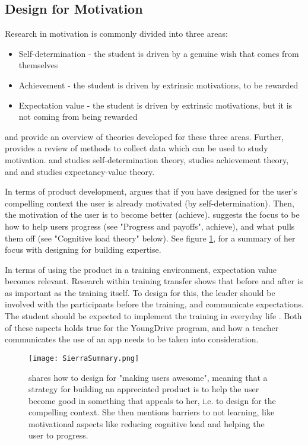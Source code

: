 \subsection{Design for Motivation}\label{sec:motivation}

Research in motivation is commonly divided into three areas:

\begin{itemize}
\item Self-determination - the student is driven by a genuine wish that comes from themselves
\item Achievement - the student is driven by extrinsic motivations, to be rewarded
\item Expectation value - the student is driven by extrinsic motivations, but it is not coming from being rewarded
\end{itemize}

\cite{koballa} and \cite{abell} provide an overview of theories developed for these three areas. Further, \cite{fulmer} provides a review of methods to collect data which can be used to study motivation. \cite{deci} and \cite{ryan} studies self-determination theory, \cite{elliot} studies achievement theory, and \cite{eccles} and \cite{wigfield} studies expectancy-value theory.

In terms of product development, \cite{sierra} argues that if you have designed for the user's compelling context the user is already motivated (by self-determination). Then, the motivation of the user is to become better (achieve). \cite{sierra} suggests the focus to be how to help users progress (see "Progress and payoffs", achieve), and what pulls them off (see "Cognitive load theory" below). See figure \ref{fig:sierra-summary}, for a summary of her focus with designing for building expertise.

In terms of using the product in a training environment, expectation value becomes relevant. Research within training transfer \citep{brinkerhoff} shows that before and after is as important as the training itself. To design for this, the leader should be involved with the participants before the training, and communicate expectations. The student should be expected to implement the training in everyday life \citep{brinkerhoff}. Both of these aspects holds true for the YoungDrive program, and how a teacher communicates the use of an app needs to be taken into consideration.

\begin{figure}[h]
  \centering
  \texttt{[image: SierraSummary.png]}
  \caption{\cite{sierra} shares how to design for "making users awesome", meaning that a strategy for building an appreciated product is to help the user become good in something that appeals to her, i.e. to design for the compelling context. She then mentions barriers to not learning, like motivational aspects like reducing cognitive load and helping the user to progress.}
  \label{fig:sierra-summary}
\end{figure}

